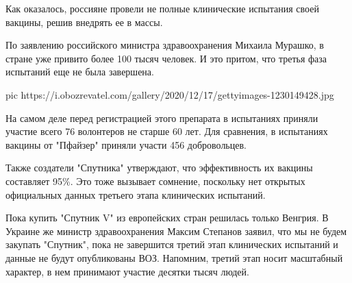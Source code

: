 Как оказалось, россияне провели не полные клинические испытания своей вакцины,
решив внедрять ее в массы.

По заявлению российского министра здравоохранения Михаила Мурашко, в стране уже
привито более 100 тысяч человек. И это притом, что третья фаза испытаний еще не
была завершена.

\ifcmt
pic https://i.obozrevatel.com/gallery/2020/12/17/gettyimages-1230149428.jpg
\fi

На самом деле перед регистрацией этого препарата в испытаниях приняли участие
всего 76 волонтеров не старше 60 лет. Для сравнения, в испытаниях вакцины от
"Пфайзер" приняли участи 456 добровольцев.

Также создатели "Спутника" утверждают, что эффективность их вакцины составляет
95\%. Это тоже вызывает сомнение, поскольку нет открытых официальных данных
третьего этапа клинических испытаний.

Пока купить "Спутник V" из европейских стран решилась только Венгрия. В Украине
же министр здравоохранения Максим Степанов заявил, что мы не будем закупать
"Спутник", пока не завершится третий этап клинических испытаний и данные не
будут опубликованы ВОЗ. Напомним, третий этап носит масштабный характер, в нем
принимают участие десятки тысяч людей.

